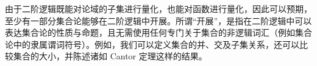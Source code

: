 \documentclass[../../../include/open-logic-section]{subfiles}
\begin{document}


由于二阶逻辑既能对论域的子集进行量化，也能对函数进行量化，因此可以预期，至少有一部分集合论能够在二阶逻辑中开展。所谓“开展”，是指在二阶逻辑中可以表达集合论的性质与命题，且无需使用任何专门关于集合的非逻辑词汇（例如集合论中的隶属谓词符号）。例如，我们可以定义集合的并、交及子集关系，还可以比较集合的大小，并陈述诸如 Cantor 定理这样的结果。
\end{document}
